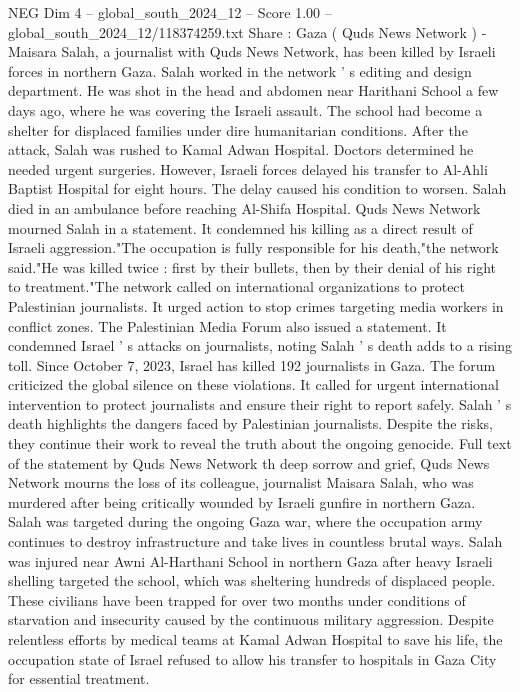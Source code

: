 \begin{textsample}{NEG Dim 4 – global\_south\_2024\_12 – Score 1.00 – global\_south\_2024\_12/118374259.txt}  \label{ex:f4_neg_204}
Share : Gaza ( Quds News Network ) - Maisara Salah, a journalist with Quds News Network, has been killed by Israeli forces in northern Gaza.
Salah worked in the network ' s editing and design department.
He was shot in the head and abdomen near Harithani School a few days ago, where he was covering the Israeli assault.
The school had become a shelter for displaced families under dire humanitarian conditions.
After the attack, Salah was rushed to Kamal Adwan Hospital.
Doctors determined he needed urgent surgeries.
However, Israeli forces delayed his transfer to Al-Ahli Baptist Hospital for eight hours.
The delay caused his condition to worsen.
Salah died in an ambulance before reaching Al-Shifa Hospital.
Quds News Network mourned Salah in a statement.
It condemned his killing as a direct result of Israeli aggression."The occupation is fully responsible for his death,"the network said."He was killed twice : first by their bullets, then by their denial of his right to treatment."The network called on international organizations to protect Palestinian journalists.
It urged action to stop crimes targeting media workers in conflict zones.
The Palestinian Media Forum also issued a statement.
It condemned Israel ' s attacks on journalists, noting Salah ' s death adds to a rising toll.
Since October 7, 2023, Israel has killed 192 journalists in Gaza.
The forum criticized the global silence on these violations.
It called for urgent international intervention to protect journalists and ensure their right to report safely.
Salah ' s death highlights the dangers faced by Palestinian journalists.
Despite the risks, they continue their work to reveal the truth about the ongoing genocide.
Full text of the statement by Quds News Network th deep sorrow and grief, Quds News Network mourns the loss of its colleague, journalist Maisara Salah, who was murdered after being critically wounded by Israeli gunfire in northern Gaza.
Salah was targeted during the ongoing Gaza war, where the occupation army continues to destroy infrastructure and take lives in countless brutal ways.
Salah was injured near Awni Al-Harthani School in northern Gaza after heavy Israeli shelling targeted the school, which was sheltering hundreds of displaced people.
These civilians have been trapped for over two months under conditions of starvation and insecurity caused by the continuous military aggression.
Despite relentless efforts by medical teams at Kamal Adwan Hospital to save his life, the occupation state of Israel refused to allow his transfer to hospitals in Gaza City for essential treatment.

\end{textsample}
